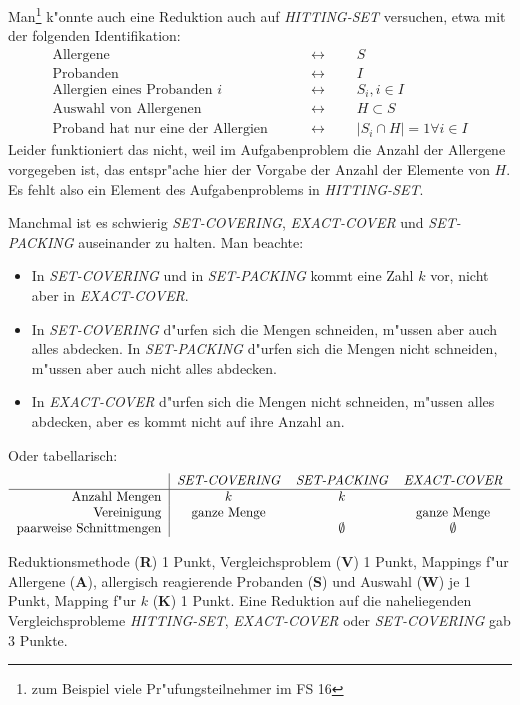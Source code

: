 \begin{diskussion}
Man\footnote{zum Beispiel viele Pr"ufungsteilnehmer im FS 16}
k"onnte auch eine Reduktion auch auf {\em HITTING-SET} versuchen, etwa
mit der folgenden Identifikation:
\begin{align*}
\text{Allergene}                    &\qquad\leftrightarrow\qquad S             \\
\text{Probanden}                    &\qquad\leftrightarrow\qquad I             \\
\text{Allergien eines Probanden $i$}&\qquad\leftrightarrow\qquad S_i, i\in I   \\
\text{Auswahl von Allergenen}       &\qquad\leftrightarrow\qquad H\subset S    \\
\text{Proband hat nur eine der Allergien}&\qquad\leftrightarrow\qquad |S_i\cap H|=1\forall i\in I
\end{align*}
Leider funktioniert das nicht, weil im Aufgabenproblem die Anzahl der Allergene
vorgegeben ist, das entspr"ache hier der Vorgabe der Anzahl der Elemente
von $H$.
Es fehlt also ein Element des Aufgabenproblems in {\em HITTING-SET}.

Manchmal ist es schwierig {\em SET-COVERING}, {\em EXACT-COVER} und
{\em SET-PACKING} auseinander zu halten.
Man beachte:
\begin{itemize}
\item
In {\em SET-COVERING} und in {\em SET-PACKING} kommt eine Zahl $k$ vor,
nicht aber in {\em EXACT-COVER}.
\item
In {\em SET-COVERING} d"urfen sich die Mengen schneiden, m"ussen aber auch
alles abdecken. 
In {\em SET-PACKING} d"urfen sich die Mengen nicht schneiden, m"ussen aber
auch nicht alles abdecken.
\item
In {\em EXACT-COVER} d"urfen sich die Mengen nicht schneiden, m"ussen alles
abdecken, aber es kommt nicht auf ihre Anzahl an.
\end{itemize}
Oder tabellarisch:
\[
\begin{tabular}{r|ccc}
                       &{\em SET-COVERING}&{\em SET-PACKING}&{\em EXACT-COVER}\\
\hline
Anzahl Mengen          &$k$               &$k$              &           \\
Vereinigung            &ganze Menge       &                 &ganze Menge\\
paarweise Schnittmengen&                  &$\emptyset$      &$\emptyset$
\end{tabular}
\]
\end{diskussion}

\begin{bewertung}
Reduktionsmethode ({\bf R}) 1 Punkt,
Vergleichsproblem ({\bf V}) 1 Punkt,
Mappings f"ur Allergene ({\bf A}), allergisch reagierende Probanden ({\bf S})
und Auswahl ({\bf W}) je 1 Punkt,
Mapping f"ur $k$ ({\bf K}) 1 Punkt.
Eine Reduktion auf die naheliegenden Vergleichsprobleme {\em HITTING-SET},
{\em EXACT-COVER} oder {\em SET-COVERING} gab 3 Punkte.
\end{bewertung}

